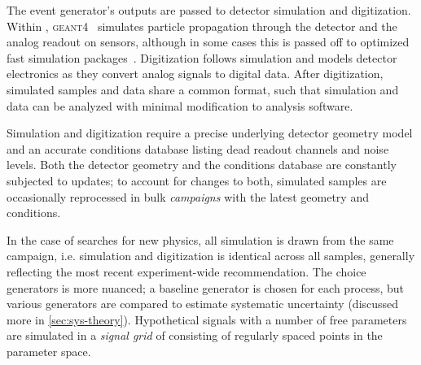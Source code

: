 The event generator's outputs are passed to detector simulation and digitization.
Within \atlas, \textsc{geant4}~\cite{geant} simulates particle propagation through the detector and the analog readout on sensors, although in some cases this is passed off to optimized fast simulation packages~\cite{atlfast}.
Digitization follows simulation and models detector electronics as they convert analog signals to digital data.
After digitization, simulated samples and data share a common format, such that simulation and data can be analyzed with minimal modification to analysis software.

Simulation and digitization require a precise underlying detector geometry model and an accurate conditions database listing dead readout channels and noise levels.
Both the detector geometry and the conditions database are constantly subjected to updates; to account for changes to both, simulated samples are occasionally reprocessed in bulk \emph{campaigns} with the latest geometry and conditions.

In the case of searches for new physics, all simulation is drawn from the same campaign, i.e. simulation and digitization is identical across all samples, generally reflecting the most recent experiment-wide recommendation.
The choice generators is more nuanced; a baseline generator is chosen for each process, but various generators are compared to estimate systematic uncertainty (discussed more in \cref{sec:sys-theory}).
Hypothetical signals with a number of free parameters are simulated in a \emph{signal grid} of consisting of regularly spaced points in the parameter space.


